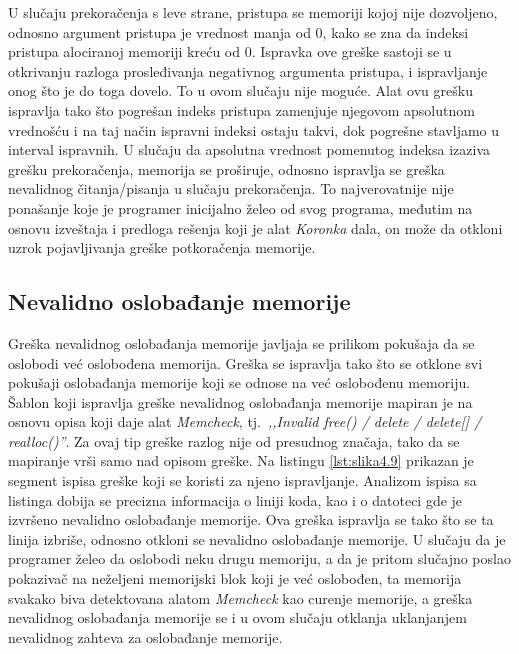 \documentclass[12pt,oneside]{memoir}
\theoremstyle{plain}
\theoremstyle{definition}
\begin{document}
U slučaju prekoračenja s leve strane, pristupa se memoriji kojoj nije dozvoljeno, odnosno argument pristupa je vrednost manja od 0, kako se zna da indeksi pristupa alociranoj memoriji kreću od 0. Ispravka ove greške sastoji se u otkrivanju razloga prosleđivanja negativnog argumenta pristupa, i ispravljanje onog što je do toga dovelo. To u ovom slučaju nije moguće. Alat ovu grešku ispravlja tako što pogrešan indeks pristupa zamenjuje njegovom apsolutnom vrednošću i na taj način ispravni indeksi ostaju takvi, dok pogrešne stavljamo u interval ispravnih. U slučaju da apsolutna vrednost pomenutog indeksa izaziva grešku prekoračenja, memorija se proširuje, odnosno ispravlja se greška nevalidnog čitanja/pisanja u slučaju prekoračenja. To najverovatnije nije ponašanje koje je programer inicijalno želeo od svog programa, međutim na osnovu izveštaja i predloga rešenja koji je alat \textit{Koronka} dala, on može da otkloni uzrok pojavljivanja greške potkoračenja memorije.

\subsection{Nevalidno oslobađanje memorije}
Greška nevalidnog oslobađanja memorije javljaja se prilikom pokušaja da se oslobodi već oslobođena memorija. Greška se ispravlja tako što se otklone  svi pokušaji oslobađanja memorije koji se odnose na već oslobođenu memoriju. Šablon koji ispravlja greške nevalidnog oslobađanja memorije mapiran je na osnovu opisa koji daje alat \textit{Memcheck}, tj.~\textit{,,Invalid free() / delete / delete[] / realloc()''}. Za ovaj tip greške razlog nije od presudnog značaja, tako da se mapiranje vrši samo nad opisom greške. Na listingu \ref{lst:slika4.9} prikazan je segment ispisa greške koji se koristi za njeno ispravljanje. Analizom ispisa sa listinga dobija se precizna informacija o liniji koda, kao i o datoteci gde je izvršeno nevalidno oslobađanje memorije. Ova greška ispravlja se tako što se ta linija izbriše, odnosno otkloni se nevalidno oslobađanje memorije. U slučaju da je programer želeo da oslobodi neku drugu memoriju, a da je pritom slučajno poslao pokazivač na neželjeni memorijski blok koji je već oslobođen, ta memorija svakako biva detektovana alatom \textit{Memcheck} kao curenje memorije, a greška nevalidnog oslobađanja memorije se i u ovom slučaju otklanja uklanjanjem nevalidnog zahteva za oslobađanje memorije.

\end{document}
